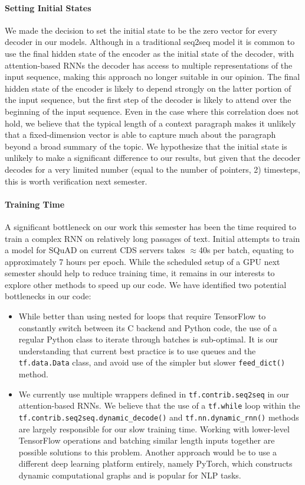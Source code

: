 \documentclass{article}
\begin{document}
\paragraph{Setting Initial States}
We made the decision to set the initial state to be the zero vector for every decoder in our models. Although in a traditional seq2seq model it is common to use the final hidden state of the encoder as the initial state of the decoder, with attention-based RNNs the decoder has access to multiple representations of the input sequence, making this approach no longer suitable in our opinion. The final hidden state of the encoder is likely to depend strongly on the latter portion of the input sequence, but the first step of the decoder is likely to attend over the beginning of the input sequence. Even in the case where this correlation does not hold, we believe that the typical length of a context paragraph makes it unlikely that a fixed-dimension vector is able to capture much about the paragraph beyond a broad summary of the topic. We hypothesize that the initial state is unlikely to make a significant difference to our results, but given that the decoder decodes for a very limited number (equal to the number of pointers, 2) timesteps, this is worth verification next semester.

\paragraph{Training Time}
A significant bottleneck on our work this semester has been the time required to train a complex RNN on relatively long passages of text. Initial attempts to train a model for SQuAD on current CDS servers takes $\approx$40s per batch, equating to approximately 7 hours per epoch. While the scheduled setup of a GPU next semester should help to reduce training time, it remains in our interests to explore other methods to speed up our code. We have identified two potential bottlenecks in our code:
\begin{itemize}
	\item While better than using nested for loops that require TensorFlow to constantly switch between its C backend and Python code, the use of a regular Python class to iterate through batches is sub-optimal. It is our understanding that current best practice is to use queues and the \texttt{tf.data.Data} class, and avoid use of the simpler but slower \texttt{feed\_dict()} method. 

	\item We currently use multiple wrappers defined in \texttt{tf.contrib.seq2seq} in our attention-based RNNs. We believe that the use of a \texttt{tf.while} loop within the \texttt{tf.contrib.seq2seq.dynamic\_decode()} and \texttt{tf.nn.dynamic\_rnn()} methods are largely responsible for our slow training time. Working with lower-level TensorFlow operations and batching similar length inputs together are possible solutions to this problem. Another approach would be to use a different deep learning platform entirely, namely PyTorch, which constructs dynamic computational graphs and is popular for NLP tasks.  
\end{itemize}
\end{document}
